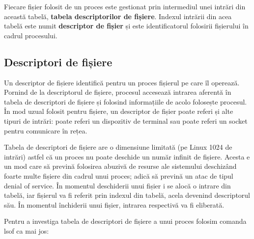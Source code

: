 Fiecare fișier folosit de un proces este gestionat prin intermediul unei intrări
din această tabelă, \textbf{tabela descriptorilor de fișiere}. Indexul intrării din acea
tabelă este numit \textbf{descriptor de fișier} și este identificatorul folosirii
fișierului în cadrul procesului.

\subsection{Descriptori de fișiere}
\label{sec:procese-fisiere-description}

Un descriptor de fișiere identifică pentru un proces fișierul pe care îl
operează. Pornind de la descriptorul de fișiere, procesul accesează intrarea
aferentă în tabela de descriptori de fișiere și folosind informațiile de acolo
folosește procesul. În mod uzual folosit pentru fișiere, un descriptor de fișier
poate referi și alte tipuri de intrări: poate referi un dispozitiv de terminal
sau poate referi un socket pentru comunicare în rețea.

Tabela de descriptori de fișiere are o dimensiune limitată (pe Linux 1024 de
intrări) astfel că un proces nu poate deschide un număr infinit de fișiere.
Acesta e un mod care să prevină folosirea abuzivă de resurse ale sistemului
deschizând foarte multe fișiere din cadrul unui proces; adică să prevină un atac
de tipul denial of service. În momentul deschiderii unui fișier i se alocă o
intrare din tabelă, iar fișierul va fi referit prin indexul din tabelă, acela
devenind descriptorul său. În momentul închiderii unui fișier, intrarea
respectivă va fi eliberată.

Pentru a investiga tabela de descriptori de fișiere a unui proces folosim
comanda lsof ca mai jos:

